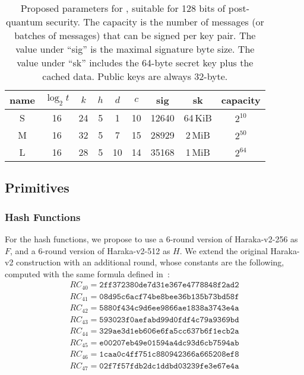 \begin{table}
\begin{center}
\begin{tabular}{c|ccccc|cc|c}
\toprule
name      & $\log_2{t}$ & $k$ & $h$ & $d$ & $c$ & sig & sk & capacity \\
\midrule
S & 16          &  24 &   5 &   1 &  10 & \num{12640} & 64\,KiB & $2^{10}$ \\
M & 16          &  32 &   5 &   7 &  15 & \num{28929} & 2\,MiB & $2^{50}$ \\
L & 16          &  28 &   5 &  10 &  14 & \num{35168} & 1\,MiB & $2^{64}$ \\
\bottomrule
\end{tabular}
\end{center}
\caption{Proposed parameters for \gravity{}, suitable for 128 bits of post-quantum security.
The capacity is the number of messages (or batches of messages) that can be signed per key pair.
The value under ``sig'' is the maximal signature byte size.
The value under ``sk'' includes the 64-byte secret key plus the cached data.
Public keys are always 32-byte.}
\label{tbl:gravity_params}
\end{table}


\subsection{Primitives}
\label{sec:primitives}

\subsubsection{Hash Functions}

For the hash functions, we propose to use a 6-round version of Haraka-v2-256 as $F$, and a 6-round version of Haraka-v2-512 as $H$.
We extend the original Haraka-v2 construction with an additional round, whose constants are the following, computed with the same formula defined in~\cite{haraka}:
\begin{align*}
    RC_{40} = \texttt{2ff372380de7d31e367e4778848f2ad2} \\
    RC_{41} = \texttt{08d95c6acf74be8bee36b135b73bd58f} \\
    RC_{42} = \texttt{5880f434c9d6ee9866ae1838a3743e4a} \\
    RC_{43} = \texttt{593023f0aefabd99d0fdf4c79a9369bd} \\
    RC_{44} = \texttt{329ae3d1eb606e6fa5cc637b6f1ecb2a} \\
    RC_{45} = \texttt{e00207eb49e01594a4dc93d6cb7594ab} \\
    RC_{46} = \texttt{1caa0c4ff751c880942366a665208ef8} \\
    RC_{47} = \texttt{02f7f57fdb2dc1ddbd03239fe3e67e4a}
\end{align*}

